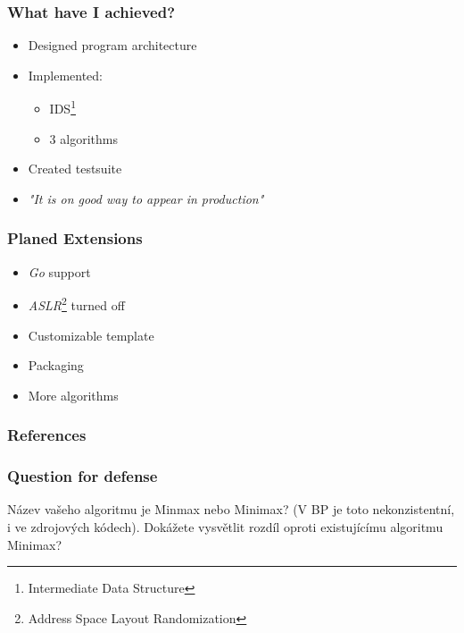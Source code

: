 \documentclass[10pt,xcolor=pdflatex]{beamer}
\begin{document}
\begin{frame}\frametitle{What have I achieved?}
    \begin{itemize}
    	\item Designed program architecture
    	\item Implemented:
    	\begin{itemize}
    		\item IDS\footnote{Intermediate Data Structure}
    		\item 3 algorithms
    	\end{itemize}
    	\item Created testsuite
    	\item \textit{"It is on good way to appear in production"}
    \end{itemize}
\end{frame}

\begin{frame}\frametitle{Planed Extensions}
  \begin{itemize}
    \item \emph{Go} support
    \item \emph{ASLR}\footnote{Address Space Layout Randomization} turned off
    \item Customizable template
    \item Packaging
    \item More algorithms
  \end{itemize}
\end{frame}

\begin{frame}[allowframebreaks]
	\frametitle{References}
	\printbibliography
\end{frame}

\appendix

\begin{frame}\frametitle{Question for defense}
    Název vašeho algoritmu je Minmax nebo Minimax? (V BP je toto nekonzistentní, i ve zdrojových kódech). Dokážete vysvětlit rozdíl oproti existujícímu algoritmu Minimax?
\end{frame}

\end{document}
